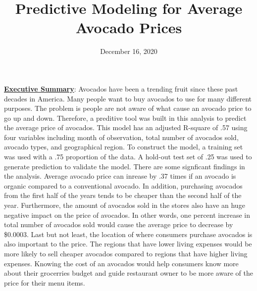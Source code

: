 \documentclass[11pt]{article}\usepackage[]{graphicx}\usepackage[]{color}
\title{Predictive Modeling for Average Avocado Prices\vspace{-5ex}}
\date{December 16, 2020\vspace{-5ex}}
\begin{document}
 
\maketitle
\hfill \break
















\noindent\textbf{\underline{Executive Summary}}: Avocados have been a trending fruit since these past decades in America. Many people want to buy avocados to use for many different purposes. The problem is people are not aware of what cause an avocado price to go up and down. Therefore, a preditive tool was built in this analysis to predict the average price of avocados. This model has an adjusted R-square of .57 using four variables including month of observation, total number of avocados sold, avocado types, and geographical region. To construct the model, a training set was used with a .75 proportion of the data. A hold-out test set of .25 was used to generate prediction to validate the model. There are some signficant findings in the analysis. Average avocado price can inrease by .37 times if an avocado is organic compared to a conventional avocado. In addition, purchasing avocados from the first half of the years tends to be cheaper than the second half of the year. Furthermore, the amount of avocados sold in the stores also have an huge negative impact on the price of avocados. In other words, one percent increase in total number of avocados sold would cause the average price to decrease by \$0.0003. Last but not least, the location of where consumers purchase avocados is also important to the price. The regions that have lower living expenses would be more likely to sell cheaper avocados compared to regions that have higher living expenses. Knowing the cost of an avocados would help consumers know more about their grocerries budget and guide restaurant owner to be more aware of the price for their menu items.             
\hfill \break
\end{document}

